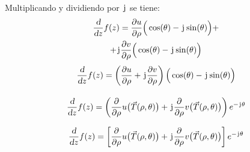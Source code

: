 Multiplicando y dividiendo por $\mkern2mu\mathrm{j}\mkern1mu$ se tiene:
\begin{multline*}
    \frac{\textsl{d}}{\textsl{d} z} f(z) = \frac{\partial u}{\partial \rho} \Big( \cos(\theta) - \mkern2mu\mathrm{j}\mkern1mu \sin(\theta) \Big) +
    \\
    + \mkern2mu\mathrm{j}\mkern1mu \frac{\partial v}{\partial \rho} \Big( \cos(\theta) - \mkern2mu\mathrm{j}\mkern1mu \sin(\theta) \Big)
\end{multline*}
\begin{gather*}
    \dfrac{\textsl{d}}{\textsl{d} z} f(z) = \left( \frac{\partial u}{\partial \rho} + \mkern2mu\mathrm{j}\mkern1mu \frac{\partial v}{\partial \rho} \right) \Big( \cos(\theta) - \mkern2mu\mathrm{j}\mkern1mu \sin(\theta) \Big)
    \\[1em]
    \frac{\textsl{d}}{\textsl{d} z} f(z) = \left( \frac{\partial}{\partial \rho} u \big( \Vec{T}(\rho,\theta) \big) + \mkern2mu\mathrm{j}\mkern1mu \frac{\partial}{\partial \rho} v \big( \Vec{T}(\rho,\theta) \big) \right) e^{-\mkern2mu\mathrm{j}\mkern1mu\theta}
\end{gather*}

\begin{mdframed}[style=PropertyFrame]
    \begin{prop}
    \end{prop}
    \begin{equation*}
        \frac{\textsl{d}}{\textsl{d} z} f(z) = \left[ \frac{\partial}{\partial \rho} u \big( \Vec{T}(\rho,\theta) \big) + \mkern2mu\mathrm{j}\mkern1mu \frac{\partial}{\partial \rho} v \big( \Vec{T}(\rho,\theta) \big) \right] e^{-\mkern2mu\mathrm{j}\mkern1mu\theta}
    \end{equation*}
\end{mdframed}